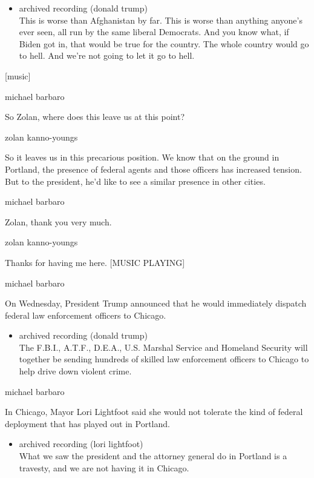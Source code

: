 \begin{itemize}
\tightlist
\item
  archived recording (donald trump)\\
  This is worse than Afghanistan by far. This is worse than anything
  anyone's ever seen, all run by the same liberal Democrats. And you
  know what, if Biden got in, that would be true for the country. The
  whole country would go to hell. And we're not going to let it go to
  hell.
\end{itemize}

{[}music{]}

michael barbaro

So Zolan, where does this leave us at this point?

zolan kanno-youngs

So it leaves us in this precarious position. We know that on the ground
in Portland, the presence of federal agents and those officers has
increased tension. But to the president, he'd like to see a similar
presence in other cities.

michael barbaro

Zolan, thank you very much.

zolan kanno-youngs

Thanks for having me here. {[}MUSIC PLAYING{]}

michael barbaro

On Wednesday, President Trump announced that he would immediately
dispatch federal law enforcement officers to Chicago.

\begin{itemize}
\tightlist
\item
  archived recording (donald trump)\\
  The F.B.I., A.T.F., D.E.A., U.S. Marshal Service and Homeland Security
  will together be sending hundreds of skilled law enforcement officers
  to Chicago to help drive down violent crime.
\end{itemize}

michael barbaro

In Chicago, Mayor Lori Lightfoot said she would not tolerate the kind of
federal deployment that has played out in Portland.

\begin{itemize}
\tightlist
\item
  archived recording (lori lightfoot)\\
  What we saw the president and the attorney general do in Portland is a
  travesty, and we are not having it in Chicago.
\end{itemize}

